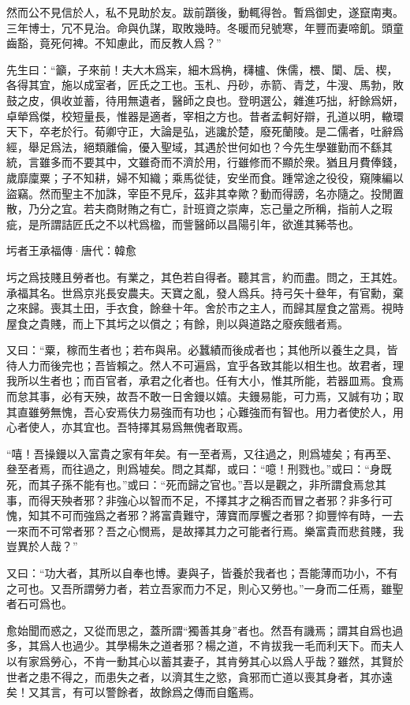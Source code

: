 \documentclass[12pt,a4paper]{ctexbook}
\begin{document}
然而公不見信於人，私不見助於友。跋前躓後，動輒得咎。暫爲御史，遂竄南夷。三年博士，冗不見治。命與仇謀，取敗幾時。冬暖而兒號寒，年豐而妻啼飢。頭童齒豁，竟死何裨。不知慮此，而反教人爲？”\par
先生曰：“籲，子來前！夫大木爲杗，細木爲桷，欂櫨、侏儒，椳、闑、扂、楔，各得其宜，施以成室者，匠氏之工也。玉札、丹砂，赤箭、青芝，牛溲、馬勃，敗鼓之皮，俱收並蓄，待用無遺者，醫師之良也。登明選公，雜進巧拙，紆餘爲妍，卓犖爲傑，校短量長，惟器是適者，宰相之方也。昔者孟軻好辯，孔道以明，轍環天下，卒老於行。荀卿守正，大論是弘，逃讒於楚，廢死蘭陵。是二儒者，吐辭爲經，舉足爲法，絕類離倫，優入聖域，其遇於世何如也？今先生學雖勤而不繇其統，言雖多而不要其中，文雖奇而不濟於用，行雖修而不顯於衆。猶且月費俸錢，歲靡廩粟；子不知耕，婦不知織；乘馬從徒，安坐而食。踵常途之役役，窺陳編以盜竊。然而聖主不加誅，宰臣不見斥，茲非其幸歟？動而得謗，名亦隨之。投閒置散，乃分之宜。若夫商財賄之有亡，計班資之崇庳，忘己量之所稱，指前人之瑕疵，是所謂詰匠氏之不以杙爲楹，而訾醫師以昌陽引年，欲進其豨苓也。\par
圬者王承福傳·唐代：韓愈 \par
圬之爲技賤且勞者也。有業之，其色若自得者。聽其言，約而盡。問之，王其姓。承福其名。世爲京兆長安農夫。天寶之亂，發人爲兵。持弓矢十叄年，有官勳，棄之來歸。喪其土田，手衣食，餘叄十年。舍於市之主人，而歸其屋食之當焉。視時屋食之貴賤，而上下其圬之以償之；有餘，則以與道路之廢疾餓者焉。\par
又曰：“粟，稼而生者也；若布與帛。必蠶績而後成者也；其他所以養生之具，皆待人力而後完也；吾皆賴之。然人不可遍爲，宜乎各致其能以相生也。故君者，理我所以生者也；而百官者，承君之化者也。任有大小，惟其所能，若器皿焉。食焉而怠其事，必有天殃，故吾不敢一日舍鏝以嬉。夫鏝易能，可力焉，又誠有功；取其直雖勞無愧，吾心安焉伕力易強而有功也；心難強而有智也。用力者使於人，用心者使人，亦其宜也。吾特擇其易爲無傀者取焉。\par
“嘻！吾操鏝以入富貴之家有年矣。有一至者焉，又往過之，則爲墟矣；有再至、叄至者焉，而往過之，則爲墟矣。問之其鄰，或曰：“噫！刑戮也。”或曰：“身既死，而其子孫不能有也。”或曰：“死而歸之官也。”吾以是觀之，非所謂食焉怠其事，而得天殃者邪？非強心以智而不足，不擇其才之稱否而冒之者邪？非多行可愧，知其不可而強爲之者邪？將富貴難守，薄寶而厚饗之者邪？抑豐悴有時，一去一來而不可常者邪？吾之心憫焉，是故擇其力之可能者行焉。樂富貴而悲貧賤，我豈異於人哉？”\par
又曰：“功大者，其所以自奉也博。妻與子，皆養於我者也；吾能薄而功小，不有之可也。又吾所謂勞力者，若立吾家而力不足，則心又勞也。”一身而二任焉，雖聖者石可爲也。\par
愈始聞而惑之，又從而思之，蓋所謂“獨善其身”者也。然吾有譏焉；謂其自爲也過多，其爲人也過少。其學楊朱之道者邪？楊之道，不肯拔我一毛而利天下。而夫人以有家爲勞心，不肯一動其心以蓄其妻子，其肯勞其心以爲人乎哉？雖然，其賢於世者之患不得之，而患失之者，以濟其生之慾，貪邪而亡道以喪其身者，其亦遠矣！又其言，有可以警餘者，故餘爲之傳而自鑑焉。\par
\end{document}
